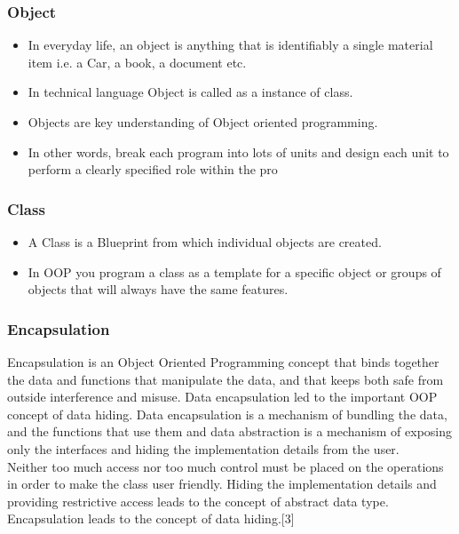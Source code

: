 	\subsubsection{Object}
	\begin{itemize}
	\item In everyday life, an object is anything that is identifiably a single material item i.e. a Car, a book, a document etc.
	\item In technical language Object is called as a instance of class.
	\item Objects are key understanding of Object oriented programming.
	\item In other words, break each program into lots of units and design each unit to perform a clearly specified role within the pro
	\end{itemize}
	\subsubsection{Class}
	\begin{itemize}
	\item A Class is a Blueprint from which individual objects are created.
	\item In OOP you program a class as a template for a specific object or groups of objects that will always have the same features.
	\end{itemize}
	\subsubsection{Encapsulation}
	Encapsulation is an Object Oriented Programming concept that binds together the data and functions that manipulate the data, and that keeps both safe from outside interference and misuse. Data encapsulation led to the important OOP concept of data hiding.
Data encapsulation is a mechanism of bundling the data, and the functions that use them and data abstraction is a mechanism of exposing only the interfaces and hiding the implementation details from the user.\\
Neither too much access nor too much control must be placed on the operations in order to make the class user friendly. Hiding the implementation details and providing restrictive access leads to the concept of abstract data type. Encapsulation leads to the concept of data hiding.[3]


